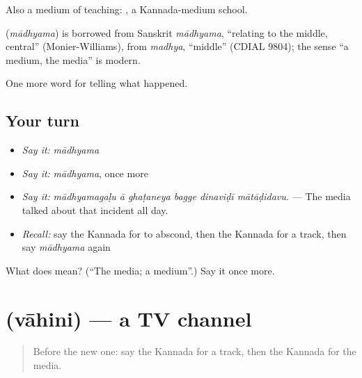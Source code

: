 Also a medium of teaching:   , a Kannada-medium school.

\begin{cousinweb}
\textbf{} (\emph{mādhyama}) is borrowed from Sanskrit \emph{mādhyama}, \textquotedblleft{}relating to the middle, central\textquotedblright{} (Monier-Williams), from \emph{madhya}, \textquotedblleft{}middle\textquotedblright{} (CDIAL 9804); the sense \textquotedblleft{}a medium, the media\textquotedblright{} is modern.
\end{cousinweb}

\begin{grammarlens}[title={What you've built}]
One more word for telling what happened.
\end{grammarlens}

\subsection*{Your turn}
\begin{itemize}
\raggedright
  \item \emph{Say it:} \emph{mādhyama}
  \item \emph{Say it:} \emph{mādhyama}, once more
  \item \emph{Say it:} \emph{mādhyamagaḷu ā ghaṭaneya bagge dinaviḍī mātāḍidavu.} — The media talked about that incident all day.
  \item \emph{Recall:} say the Kannada for to abscond, then the Kannada for a track, then say \emph{mādhyama} again
\end{itemize}

\begin{tcolorbox}[breakable,colback=teal!4,colframe=teal!35!black,title={Before you move on}]
What does  mean? (\textquotedblleft{}The media; a medium\textquotedblright{}.) Say it once more.
\end{tcolorbox}
\section[\texorpdfstring{\kn{ವಾಹಿನಿ} (vāhini)}{ವಾಹಿನಿ (vāhini)}]{ (vāhini) — a TV channel}

\label{lesson:KA-C329-vahini}



\begin{quote}
Before the new one: say the Kannada for a track, then the Kannada for the media.
\end{quote}

